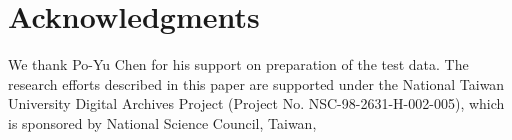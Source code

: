 
\section*{Acknowledgments}

We thank Po-Yu Chen for his support on preparation of the test data.  The
research efforts described in this paper are supported under the National Taiwan
University Digital Archives Project (Project No.  NSC-98-2631-H-002-005), which
is sponsored by National Science Council, Taiwan, 
